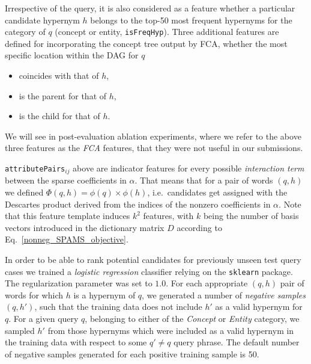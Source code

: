 \documentclass[11pt,a4paper]{article}
\begin{document}
Irrespective of the query, it is also considered as a feature whether a
particular candidate hypernym $h$ belongs to the top-50 most frequent hypernyms
for the category of $q$ (concept or entity, \texttt{isFreqHyp}).
Three additional features are defined for incorporating the concept tree output
by FCA, whether the most specific location within the DAG for $q$
\begin{itemize}
	\item coincides with that of $h$,
	\item is the parent for that of $h$,
	\item is the child for that of $h$.
\end{itemize}
We will see in post-evaluation ablation experiments, where we refer to the
above three features as the \emph{FCA} features, that they were not useful in
our submissions.

\texttt{attributePairs}$_{ij}$ above are indicator features for every possible
\emph{interaction term}
between the sparse coefficients in $\alpha$. That means that for a pair of
words $(q, h)$ we defined $\Phi(q,h)=\phi(q) \times \phi(h)$, i.e.~candidates
get assigned with the Descartes product derived from the indices of the nonzero
coefficients in $\alpha$. Note that this feature template induces $k^2$
features, with $k$ being the number of basis vectors introduced in the dictionary matrix $D$ according to Eq.~\ref{nonneg_SPAMS_objective}.

In order to be able to rank potential candidates for previously unseen test
query cases we trained a \emph{logistic regression} classifier relying on the
\texttt{sklearn} package. The regularization parameter was set to $1.0$. 
For each appropriate $(q,h)$ pair of words for which
$h$ is a hypernym of $q$, we generated a number of \emph{negative samples} $(q, h')$,
such that the training data does not include $h'$ as a valid hypernym for $q$.
For a given query $q$, belonging to either of the \textit{Concept} or
\textit{Entity} category, we sampled $h'$ from those hypernyms which were
included as a valid hypernym in the training data with respect to some $q' \neq
q$ query phrase. The default number of negative samples generated for each
positive training sample is 50.
\end{document}
